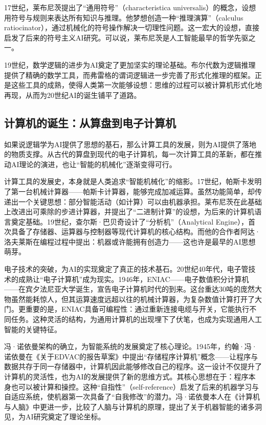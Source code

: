 17世纪，莱布尼茨提出了“通用符号”（characteristica universalis）的概念，设想用符号与规则来表达所有知识与推理。他梦想创造一种“推理演算”（calculus ratiocinator），通过机械化的符号操作解决一切理性问题。这一宏大的设想，直接启发了后来的符号主义AI研究。可以说，莱布尼茨是人工智能最早的哲学先驱之一。

19世纪，数学逻辑的进步为AI奠定了更加坚实的理论基础。布尔代数为逻辑推理提供了精确的数学工具，而弗雷格的谓词逻辑进一步完善了形式化推理的框架。正是这些工具的成熟，使得人类第一次能够设想：思维的过程可以被计算机形式化地再现，从而为20世纪AI的诞生铺平了道路。

\subsection{计算机的诞生：从算盘到电子计算机}

如果说逻辑学为AI提供了思想的基石，那么计算工具的发展，则为AI提供了落地的物质支撑。从古代的算盘到现代的电子计算机，每一次计算工具的革新，都在推动AI理论的演进，也让“智能的机械化”逐渐变得可行。

计算工具的发展史，本身就是人类追求“智能机械化”的缩影。17世纪，帕斯卡发明了第一台机械计算器——帕斯卡计算器，能够完成加减运算。虽然功能简单，却传递出一个关键思想：部分智能活动（如计算）可以由机器承担。莱布尼茨在此基础上改进出可乘除的步进计算器，并提出了“二进制计算”的设想，为后来的计算机语言奠定基础。19世纪，查尔斯·巴贝奇设计了“分析机”（Analytical Engine），首次具备了存储器、运算器与控制器等现代计算机的核心结构。而他的合作者阿达·洛夫莱斯在编程过程中提出：机器或许能拥有创造力——这也许是最早的AI思想萌芽。

电子技术的突破，为AI的实现奠定了真正的技术基石。20世纪40年代，电子管技术的成熟让“电子计算机”成为现实。1946年，ENIAC——电子数值积分计算机——在宾夕法尼亚大学诞生，宣告电子计算机时代的到来。这台重达30吨的庞然大物虽然能耗惊人，但其运算速度远超以往的机械计算器，为复杂数值计算打开了大门。更重要的是，ENIAC具备可编程性：通过重新连接电缆与开关，它能执行不同任务。这种灵活的结构，为通用计算机的出现埋下了伏笔，也成为实现通用人工智能的关键特征。

冯·诺依曼架构的确立，为智能系统的发展奠定了核心理论。1945年，约翰·冯·诺依曼在《关于EDVAC的报告草案》中提出“存储程序计算机”概念——让程序与数据共存于同一存储器中，计算机因此能够修改自己的程序。这一设计不仅提升了计算机的灵活性，也为AI的发展提供了新的思维方式。其核心思想在于：程序本身也可以被计算和操控。这种“自指性”（self-reference）启发了后来的机器学习与自适应系统，使机器第一次具备了“自我修改”的潜力。冯·诺依曼本人在《计算机与人脑》中更进一步，比较了人脑与计算机的原理，提出了关于机器智能的诸多洞见，为AI研究奠定了理论坐标。

